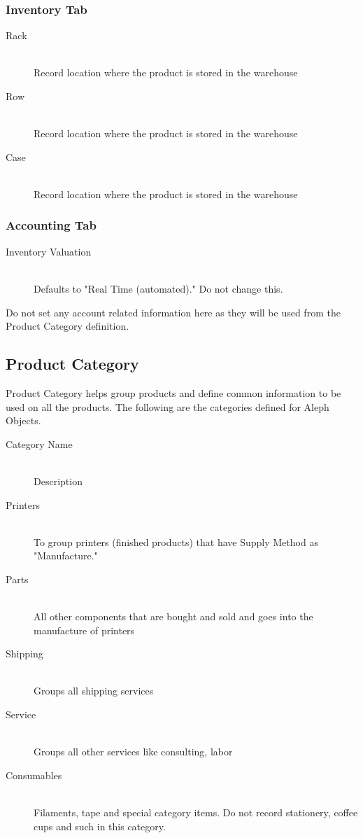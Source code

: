 \subsubsection{Inventory Tab}

\begin{description}
\item[Rack] \hfill \\
Record location where the product is stored in the warehouse
\item[Row] \hfill \\
Record location where the product is stored in the warehouse
\item[Case] \hfill \\
Record location where the product is stored in the warehouse
\end{description}

\subsubsection{Accounting Tab}

\begin{description}
\item[Inventory Valuation] \hfill \\
Defaults to "Real Time (automated)." Do not change this.
\end{description}

Do not set any account related information here as they will be used from the Product Category definition.

\subsection{Product Category}
 Product Category helps group products and define common information to be used on all the products. The following are the categories defined for Aleph Objects. 

\begin{description}
\item[Category Name] \hfill \\
Description
\item[Printers] \hfill \\
To group printers (finished products) that have Supply Method as "Manufacture."
\item[Parts] \hfill \\
All other components that are bought and sold and goes into the manufacture of printers
\item[Shipping] \hfill \\
Groups all shipping services
\item[Service] \hfill \\
Groups all other services like consulting, labor
\item[Consumables] \hfill \\
Filaments, tape and special category items. Do not record stationery, coffee cups and such in this category.
\end{description}

